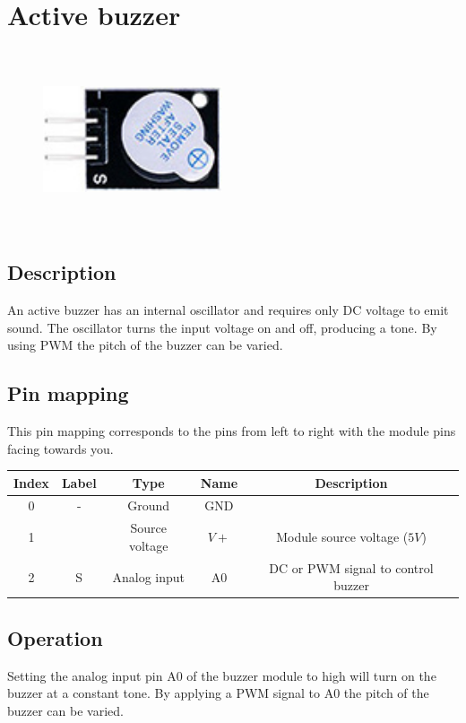\section{Active buzzer}
\begin{figure}[H]
    \centering
    \includegraphics[angle=0, keepaspectratio=true, scale=1, width=200px, height=200px]{images/buzzer1.jpg}
\end{figure}
\subsection*{Description}
An active buzzer has an internal oscillator and requires only DC voltage to emit sound. The oscillator turns the input voltage on and off, producing a tone. By using PWM the pitch of the buzzer can be varied.
\subsection*{Pin mapping}
This pin mapping corresponds to the pins from left to right with the module pins facing towards you.
\begin{table}[H]
    \centering
    \begin{tabular}{|c|c|c|c|c|}
    \hline
    Index &Label &Type &Name &Description\\ \hline
    0 &- &Ground &GND &\\ \hline
    1 & &Source voltage &$V+$ &Module source voltage ($5V$)\\ \hline
    2 &S &Analog input &A0 &DC or PWM signal to control buzzer\\ \hline
    \end{tabular}
\end{table}
\subsection*{Operation}
Setting the analog input pin A0 of the buzzer module to high will turn on the buzzer at a constant tone. By applying a PWM signal to A0 the pitch of the buzzer can be varied.
%